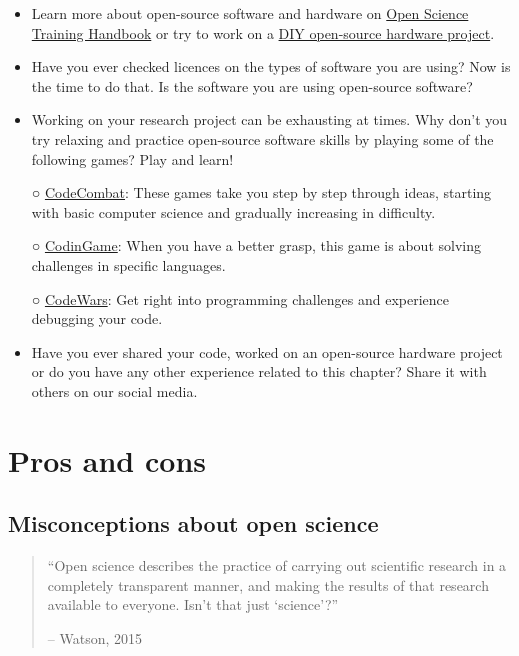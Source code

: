 \documentclass[
]{book}
\begin{document}
\begin{itemize}
\item
  Learn more about open-source software and hardware on \href{https://open-science-training-handbook.gitbook.io/book/open-science-basics/open-research-software-and-open-source}{Open Science Training Handbook} or try to work on a \href{https://en.wikipedia.org/wiki/List_of_open-source_hardware_projects}{DIY open-source hardware project}.
\item
  Have you ever checked licences on the types of software you are using? Now is the time to do that. Is the software you are using open-source software?
\item
  Working on your research project can be exhausting at times. Why don't you try relaxing and practice open-source software skills by playing some of the following games? Play and learn!

  ○ \href{https://codecombat.com/}{CodeCombat}: These games take you step by step through ideas, starting with basic computer science and gradually increasing in difficulty.

  ○ \href{https://www.codingame.com/start}{CodinGame}: When you have a better grasp, this game is about solving challenges in specific languages.

  ○ \href{https://www.codewars.com/}{CodeWars}: Get right into programming challenges and experience debugging your code.
\item
  Have you ever shared your code, worked on an open-source hardware project or do you have any other experience related to this chapter? Share it with others on our social media.
\end{itemize}

\hypertarget{pros-and-cons}{%
\chapter{Pros and cons}\label{pros-and-cons}}

\hypertarget{misconceptions-about-open-science}{%
\section{Misconceptions about open science}\label{misconceptions-about-open-science}}

\begin{quote}
``Open science describes the practice of carrying out scientific research in a completely transparent manner, and making the results of that research available to everyone. Isn't that just `science'?''

-- Watson, 2015
\end{quote}
\end{document}

